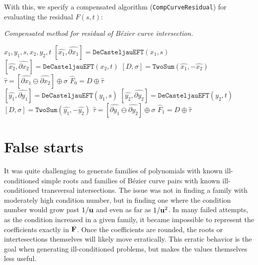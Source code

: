 With this, we specify a compensated algorithm (\texttt{CompCurveResidual})
for evaluating the residual \(F(s, t)\):
\begin{breakablealgorithm}
  \caption{\textit{Compensated method for residual of
      B\'{e}zier curve intersection.}}
  \label{alg:compensated-residual}

  \begin{algorithmic}
             {$x_1, y_1, s, x_2, y_2, t$}
      \State \(\left[\widehat{x_1}, \widehat{\partial x_1}\right] =
        \mathtt{DeCasteljauEFT}(x_1, s)\)
      \State \(\left[\widehat{x_2}, \widehat{\partial x_2}\right] =
        \mathtt{DeCasteljauEFT}(x_2, t)\)
      \State \(\left[D, \sigma\right] = \mathtt{TwoSum}(
        \widehat{x_1}, -\widehat{x_2})\)
      \State \(\widehat{\tau} = \left[\widehat{\partial x_1} \ominus
        \widehat{\partial x_2}\right] \oplus \sigma\)
      \State \(\widehat{F}_0 = D \oplus \widehat{\tau}\)
      \\
      \State \(\left[\widehat{y_1}, \widehat{\partial y_1}\right] =
        \mathtt{DeCasteljauEFT}(y_1, s)\)
      \State \(\left[\widehat{y_2}, \widehat{\partial y_2}\right] =
        \mathtt{DeCasteljauEFT}(y_2, t)\)
      \State \(\left[D, \sigma\right] = \mathtt{TwoSum}(
        \widehat{y_1}, -\widehat{y_2})\)
      \State \(\widehat{\tau} = \left[\widehat{\partial y_1} \ominus
        \widehat{\partial y_2}\right] \oplus \sigma\)
      \State \(\widehat{F}_1 = D \oplus \widehat{\tau}\)
    \EndFunction
  \end{algorithmic}
\end{breakablealgorithm}

\section{False starts}\label{sec:false-starts}

It was quite challenging to generate families of polynomials with known
ill-conditioned simple roots and families of B\'{e}zier curve pairs with known
ill-conditioned transversal intersections. The issue was not in finding a
family with moderately high condition number, but in finding one where the
condition number would grow past \(1 / \mathbf{u}\) and even as far as
\(1 / \mathbf{u}^2\). In many failed attempts, as the condition increased
in a given family, it became impossible to represent the
coefficients exactly in \(\mathbf{F}\). Once the coefficients are rounded,
the roots or intertesections themselves will likely move erratically.
This erratic behavior is the goal when generating ill-conditioned problems,
but makes the values themselves less useful.

